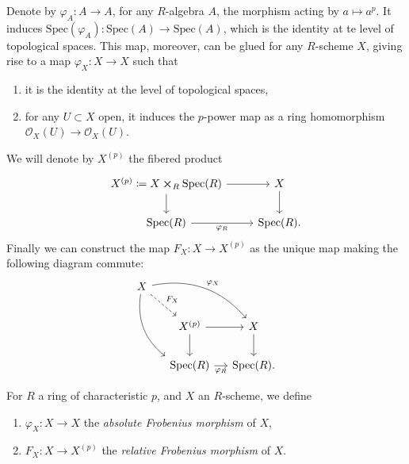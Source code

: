 \documentclass[../Main]{subfiles}
\begin{document}
\begin{defn}[]
	Denote by $\varphi_A\colon A \to A$, for any $R$-algebra $A$, the morphism
	acting by $a \mapsto a^p$.
	It induces $\mathrm{Spec}(\varphi_A)\colon \mathrm{Spec}(A) \to \mathrm{Spec}(A)$,
	which is the identity at te level of topological spaces.
	This map, moreover, can be glued for any $R$-scheme $X$, giving rise to a map
	$\varphi_X\colon X \to X$ such that
\begin{enumerate}
	\item it is the identity at the level of topological spaces,
	\item for any $U \subset X$ open, it induces the $p$-power map
		as a ring homomorphism $\mathcal{O}_{X}(U) \to \mathcal{O}_{ X }(U)$.
\end{enumerate}
	We will denote by $X^{(p)}$ the fibered product
	\begin{equation}
	\begin{tikzcd}
		X^{(p)} \coloneqq X \cross_{ R } \mathrm{Spec}(R) \arrow[r, "", rightarrow] 
		\arrow[d, "", rightarrow] &
		X \arrow[d, "", rightarrow] \\
		\mathrm{Spec}(R) \arrow[r, "\varphi_R"', rightarrow] &
		\mathrm{Spec}(R)
	.\end{tikzcd}
	\end{equation}
	Finally we can construct the map $F_X \colon X \to X^{(p)}$ as the unique map
	making the following diagram commute:
	\begin{equation}
	\begin{tikzcd}[row sep=2.0em, column sep=1.2em]
		X \arrow[rrd, "\varphi_X", rightarrow, bend left] 
		\arrow[rdd, "", rightarrow, bend right, end anchor=north west]
		\arrow[rd, "F_X", dashrightarrow] & & \\
		&
		X^{(p)} \arrow[r, "", rightarrow] 
		\arrow[d, "", rightarrow] &
		X \arrow[d, "", rightarrow] \\
		&
		\mathrm{Spec}(R) \arrow[r, "\varphi_R"', rightarrow] &
		\mathrm{Spec}(R)
	.\end{tikzcd}
	\end{equation}
\end{defn}


\begin{defn}
	For $R$ a ring of characteristic $p$, and $X$ an $R$-scheme, we define
\begin{enumerate}
	\item $\varphi_X\colon X \to X$ the {\em absolute Frobenius morphism} of $X$,
	\item $F_X \colon X \to X^{(p)}$ the {\em relative Frobenius morphism} of $X$.
\end{enumerate}
\end{defn}
\end{document}
